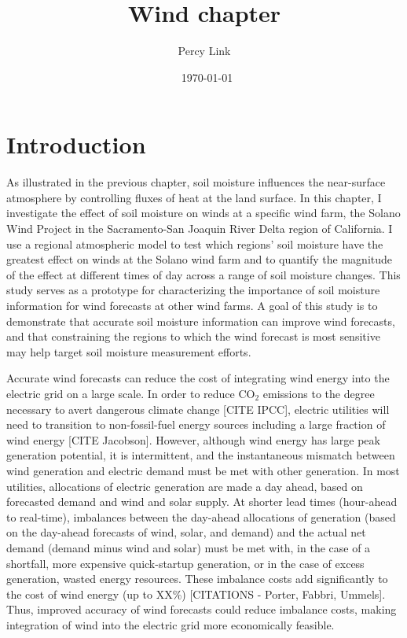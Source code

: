 \documentclass[12pt]{amsart}
\title{Wind chapter}
\author{Percy Link}
\date{\currenttime \ \today} %
\begin{document}
\maketitle

\section{Introduction}

As illustrated in the previous chapter, soil moisture influences the near-surface atmosphere by controlling fluxes of heat at the land surface.  In this chapter, I investigate the effect of soil moisture on winds at a specific wind farm, the Solano Wind Project in the Sacramento-San Joaquin River Delta region of California.  I use a regional atmospheric model to test which regions' soil moisture have the greatest effect on winds at the Solano wind farm and to quantify the magnitude of the effect at different times of day across a range of soil moisture changes.  This study serves as a prototype for characterizing the importance of soil moisture information for wind forecasts at other wind farms.  A goal of this study is to demonstrate that accurate soil moisture information can improve wind forecasts, and that constraining the regions to which the wind forecast is most sensitive may help target soil moisture measurement efforts.

Accurate wind forecasts can reduce the cost of integrating wind energy into the electric grid on a large scale.  In order to reduce CO$_2$ emissions to the degree necessary to avert dangerous climate change [CITE IPCC], electric utilities will need to transition to non-fossil-fuel energy sources including a large fraction of wind energy [CITE Jacobson].  However, although wind energy has large peak generation potential, it is intermittent, and the instantaneous mismatch between wind generation and electric demand must be met with other generation.  In most utilities, allocations of electric generation are made a day ahead, based on forecasted demand and wind and solar supply.  At shorter lead times (hour-ahead to real-time), imbalances between the day-ahead allocations of generation (based on the day-ahead forecasts of wind, solar, and demand) and the actual net demand (demand minus wind and solar) must be met with, in the case of a shortfall, more expensive quick-startup generation, or in the case of excess generation, wasted energy resources.  These imbalance costs add significantly to the cost of wind energy (up to XX\%) [CITATIONS - Porter, Fabbri, Ummels].  Thus, improved accuracy of wind forecasts could reduce imbalance costs, making integration of wind into the electric grid more economically feasible.
\end{document}

